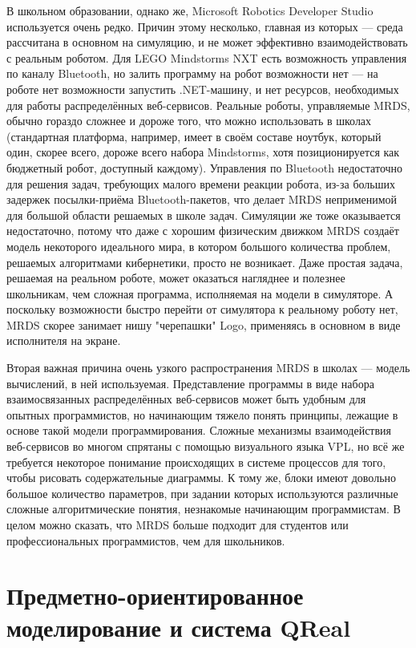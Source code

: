 \documentclass[a4paper]{article}
\begin{document}
В школьном образовании, однако же, Microsoft Robotics Developer Studio используется очень редко. Причин этому несколько, главная из которых --- среда рассчитана в основном на симуляцию, и не может эффективно взаимодействовать с реальным роботом. Для LEGO Mindstorms NXT есть возможность управления по каналу Bluetooth, но залить программу на робот возможности нет --- на роботе нет возможности запустить .NET-машину, и нет ресурсов, необходимых для работы распределённых веб-сервисов. Реальные роботы, управляемые MRDS, обычно гораздо сложнее и дороже того, что можно использовать в школах (стандартная платформа, например, имеет в своём составе ноутбук, который один, скорее всего, дороже всего набора Mindstorms, хотя позиционируется как бюджетный робот, доступный каждому). Управления по Bluetooth недостаточно для решения задач, требующих малого времени реакции робота, из-за больших задержек посылки-приёма Bluetooth-пакетов, что делает MRDS неприменимой для большой области решаемых в школе задач. Симуляции же тоже оказывается недостаточно, потому что даже с хорошим физическим движком MRDS создаёт модель некоторого идеального мира, в котором большого количества проблем, решаемых алгоритмами кибернетики, просто не возникает. Даже простая задача, решаемая на реальном роботе, может оказаться нагляднее и полезнее школьникам, чем сложная программа, исполняемая на модели в симуляторе. А поскольку возможности быстро перейти от симулятора к реальному роботу нет, MRDS скорее занимает нишу "черепашки" Logo, применяясь в основном в виде исполнителя на экране.

Вторая важная причина очень узкого распространения MRDS в школах --- модель вычислений, в ней используемая. Представление программы в виде набора взаимосвязанных распределённых веб-сервисов может быть удобным для опытных программистов, но начинающим тяжело понять принципы, лежащие в основе такой модели программирования. Сложные механизмы взаимодействия веб-сервисов во многом спрятаны с помощью визуального языка VPL, но всё же требуется некоторое понимание происходящих в системе процессов для того, чтобы рисовать содержательные диаграммы. К тому же, блоки имеют довольно большое количество параметров, при задании которых используются различные сложные алгоритмические понятия, незнакомые начинающим программистам. В целом можно сказать, что MRDS больше подходит для студентов или профессиональных программистов, чем для школьников.

\section{Предметно-ориентированное моделирование и система QReal}
\end{document}
